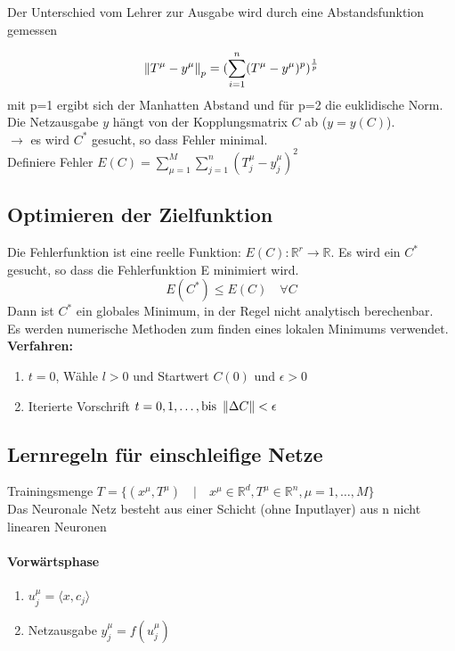 Der Unterschied vom Lehrer zur Ausgabe wird durch eine Abstandsfunktion gemessen

\begin{equation*}
    \left\lVert T^\mu - y^\mu\right\rVert_p = (\sum_{i=1}^n (T^\mu - y^\mu)^p)^{\frac{1}{p}}
\end{equation*}
mit p=1 ergibt sich der Manhatten Abstand und für p=2 die euklidische Norm.\\
Die Netzausgabe $y$ hängt von der Kopplungsmatrix $C$ ab ($y=y(C)$).\\
$\rightarrow$ es wird $C^*$ gesucht, so dass Fehler minimal.\\
Definiere Fehler $E(C) = \sum_{\mu=1}^M \sum_{j=1}^n(T_j^\mu - y_j^\mu)^2$

\subsection{Optimieren der Zielfunktion}
Die Fehlerfunktion ist eine reelle Funktion: $E(C): \mathbb{R}^r\to \mathbb{R}$. Es wird ein $C^*$ gesucht, so dass die Fehlerfunktion E minimiert wird. 
\begin{equation*}
    E(C^*)\leq E(C) \quad \forall C
\end{equation*}
Dann ist $C^*$ ein globales Minimum, in der Regel nicht analytisch berechenbar.\\
Es werden numerische Methoden zum finden eines lokalen Minimums verwendet.\\
\textbf{Verfahren:}
\begin{enumerate}
    \item $t=0$, Wähle $l>0$ und Startwert $C(0)$ und $\epsilon>0$
    \item Iterierte Vorschrift $t=0,1,\dots,\text{bis }\left\lVert\Delta C\right\rVert<\epsilon$
\end{enumerate}

\subsection{Lernregeln für einschleifige Netze}
Trainingsmenge $ T = \{(x^\mu,T^\mu) \quad|\quad x^\mu \in \mathbb{R}^d, T^\mu \in \mathbb{R}^n, \mu=1,\dots,M\}$\\
Das Neuronale Netz besteht aus einer Schicht (ohne Inputlayer) aus n nicht linearen Neuronen

\paragraph{Vorwärtsphase}
\begin{enumerate}
    \item $u_j^\mu = \langle x,c_j\rangle$
    \item Netzausgabe $y_j^\mu = f(u_j^\mu)$
\end{enumerate}

